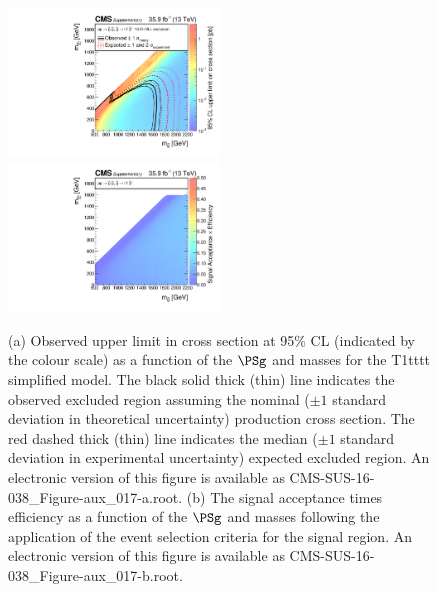 \begin{figure}
    \begin{center}
            \includegraphics[width=0.50\textwidth]{Supplementary/CMS-SUS-16-038_Figure-aux_017-a}
            \includegraphics[width=0.50\textwidth]{Supplementary/CMS-SUS-16-038_Figure-aux_017-b}
        \caption{ (a) Observed upper limit in cross section at 95\% CL (indicated
        by the colour scale) as a function of 
        the $\PSg$ and \PSGczDo %
        masses for the 
        T1tttt %
        simplified  model.  The  black  solid thick  (thin)  line indicates  the
        observed  excluded  region  assuming   the  nominal  (${\pm}1$  standard
        deviation in theoretical uncertainty)  production cross section. The red
        dashed  thick  (thin)  line  indicates  the  median  (${\pm}1$  standard
        deviation in experimental uncertainty) expected excluded region.
    An electronic version of this figure is available as CMS-SUS-16-038\_Figure-aux\_017-a.root.
        (b) The signal acceptance times efficiency as a function of 
        the $\PSg$ and \PSGczDo %
        masses following the application of the event selection criteria for the signal region.
    An electronic version of this figure is available as CMS-SUS-16-038\_Figure-aux\_017-b.root.
        }
        \label{fig:T1tttt}
    \end{center}
\end{figure}

